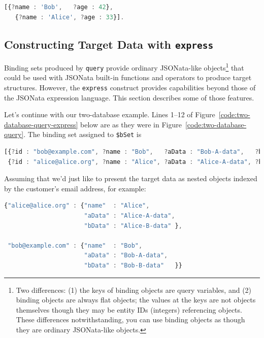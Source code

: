 \documentclass[10pt,letterpaper]{article} %
\newcommand{\stt}[1]{\texttt{#1}} %
\begin{document}
\begin{lstlisting}[language=JavaScript,numbers=none,basicstyle=\ttfamily\scriptsize]
  [{?name : 'Bob',   ?age : 42},
   {?name : 'Alice', ?age : 33}].
\end{lstlisting} \vspace{-2em}

\subsection{Constructing  Target Data with \stt{express}}

Binding sets produced by \stt{query} provide ordinary JSONata-like objects\footnote{Two differences: (1) the keys of binding objects are query variables, and (2) binding objects are always flat objects; the values at the keys are not objects themselves though they may be entity IDs (integers) referencing objects. These differences notwithstanding, you can use binding objects as though they are ordinary JSONata-like objects.} that could be used with JSONata built-in functions and operators to produce target structures.
However, the \stt{express} construct provides capabilities beyond those of the JSONata expression language.
This section describes some of those features.

Let's continue with our two-database example.
Lines 1--12 of Figure~\ref{code:two-database-query-express} below are as they were in Figure~\ref{code:two-database-query}.
The binding set assigned to \stt{\$bSet} is
\begin{lstlisting}[language=JavaScript,numbers=none,basicstyle=\ttfamily\scriptsize]
[{?id : "bob@example.com", ?name : "Bob",   ?aData : "Bob-A-data",   ?bData : "Bob-B-data"  },
 {?id : "alice@alice.org", ?name : "Alice", ?aData : "Alice-A-data", ?bData : "Alice-B-data"}].
\end{lstlisting} \vspace{-2em}

Assuming that we'd just like to present the target data as nested objects indexed by the customer's email address, for example:

\begin{lstlisting}[language=JavaScript,numbers=none,basicstyle=\ttfamily\scriptsize]
{"alice@alice.org" : {"name"  : "Alice",
                      "aData" : "Alice-A-data",
                      "bData" : "Alice-B-data" },

 "bob@example.com" : {"name"  : "Bob",
                      "aData" : "Bob-A-data",
                      "bData" : "Bob-B-data"   }}
\end{lstlisting} \vspace{-2em}
\end{document}
